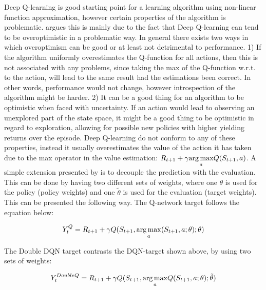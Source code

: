 Deep Q-learning is good starting point for a learning algorithm using non-linear function approximation, however certain properties of the algorithm is problematic. \textcite{van_hasselt_deep_2015} argues this is mainly due to the fact that Deep Q-learning can tend to be overoptimistic in a problematic way. In general there exists two ways in which overoptimism can be good or at least not detrimental to performance. 1) If the algorithm uniformly overestimates the Q-function for all actions, then this is not associated with any problems, since taking the max of the Q-function w.r.t. to the action, will lead to the same result had the estimations been correct. In other words, performance would not change, however introspection of the algorithm might be harder. 2) It can be a good thing for an algorithm to be optimistic when faced with uncertainty. If an action would lead to observing an unexplored part of the state space, it might be a good thing to be optimistic in regard to exploration, allowing for possible new policies with higher yielding returns over the episode. Deep Q-learning do not conform to any of these properties, instead it usually overestimates the value of the action it has taken due to the max operator in the value estimation: $R_{t+1} + \gamma \underset{a}{\operatorname*{arg\,max}} Q(S_{t+1},a)$. A simple extension presented by \textcite{van_hasselt_deep_2015} is to decouple the prediction with the evaluation. This can be done by having two different sets of weights, where one $\theta$ is used for the policy (policy weights) and one $\tilde{\theta}$ is used for the evaluation (target weights). This can be presented the following way. The Q-network target follows the equation below:

\begin{equation}\label{eq:dqn_target}
    Y_t^{Q} = R_{t+1} + \gamma Q(S_{t+1}, \underset{a}{\operatorname*{arg\,max}} (S_{t+1}, a ; \theta) ; \theta)
\end{equation}

The Double DQN target contrasts the DQN-target shown above, by using two sets of weights:

\begin{equation}\label{eq:ddqn_target}
    Y_t^{DoubleQ} = R_{t+1} + \gamma Q(S_{t+1}, \underset{a}{\operatorname*{arg\,max}}Q(S_{t+1}, a; \theta); \tilde{\theta}) 
\end{equation}

